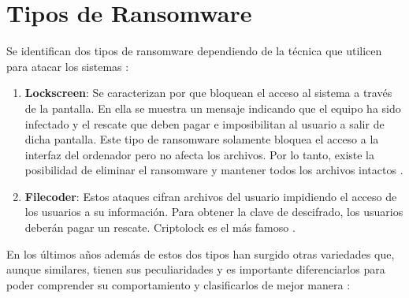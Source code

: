 \section{Tipos de Ransomware}\label{sec:2-4}

\noindent Se identifican dos tipos de ransomware dependiendo de la técnica que utilicen para atacar los sistemas \cite{ransommasive}:

\begin{enumerate}
    \item \textbf{Lockscreen}: Se caracterizan por que bloquean el acceso al sistema a través de la pantalla. En ella se muestra un mensaje indicando que el equipo ha sido infectado y el rescate que deben pagar e imposibilitan al usuario a salir de dicha pantalla.
    Este tipo de ransomware solamente bloquea el acceso a la interfaz del ordenador pero no afecta los archivos. Por lo tanto, existe la posibilidad de eliminar el ransomware y mantener todos los archivos intactos \cite{80}.
    \item \textbf{Filecoder}: Estos ataques cifran archivos del usuario impidiendo el acceso de los usuarios  a su información. Para obtener la clave de descifrado, los usuarios deberán pagar un rescate. Criptolock es el más famoso \cite{79}.
    
\end{enumerate}


En los últimos años además de estos dos tipos han surgido otras variedades que, aunque similares, tienen sus peculiaridades y es importante diferenciarlos para poder comprender su comportamiento y clasificarlos de mejor manera \cite{81}:

